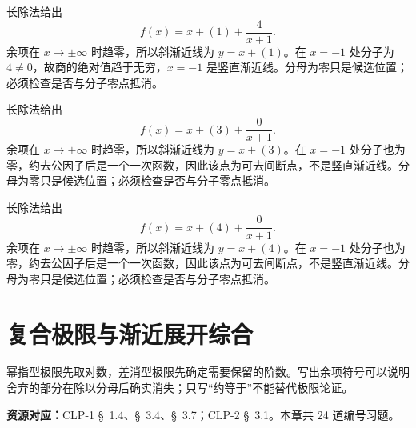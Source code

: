 \documentclass[12pt,fontset=fandol]{ctexart}
\begin{document}
\begin{solve}\label{ans:c4q22}
长除法给出
\[
f(x)=x+(1)+\frac{4}{x+1}.
\]
余项在 $x\to\pm\infty$ 时趋零，所以斜渐近线为 $y=x+(1)$。在 $x=-1$ 处分子为 $4\ne0$，故商的绝对值趋于无穷，$x=-1$ 是竖直渐近线。分母为零只是候选位置；必须检查是否与分子零点抵消。
\end{solve}

\begin{solve}\label{ans:c4q23}
长除法给出
\[
f(x)=x+(3)+\frac{0}{x+1}.
\]
余项在 $x\to\pm\infty$ 时趋零，所以斜渐近线为 $y=x+(3)$。在 $x=-1$ 处分子也为零，约去公因子后是一个一次函数，因此该点为可去间断点，不是竖直渐近线。分母为零只是候选位置；必须检查是否与分子零点抵消。
\end{solve}

\begin{solve}\label{ans:c4q24}
长除法给出
\[
f(x)=x+(4)+\frac{0}{x+1}.
\]
余项在 $x\to\pm\infty$ 时趋零，所以斜渐近线为 $y=x+(4)$。在 $x=-1$ 处分子也为零，约去公因子后是一个一次函数，因此该点为可去间断点，不是竖直渐近线。分母为零只是候选位置；必须检查是否与分子零点抵消。
\end{solve}

\clearpage
\section{复合极限与渐近展开综合}\label{sec:ch5}
幂指型极限先取对数，差消型极限先确定需要保留的阶数。写出余项符号可以说明舍弃的部分在除以分母后确实消失；只写“约等于”不能替代极限论证。

\textbf{资源对应：}CLP-1 \S~1.4、\S~3.4、\S~3.7；CLP-2 \S~3.1。本章共 24 道编号习题。
\end{document}
